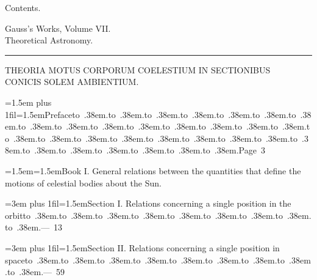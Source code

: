 \clearpage
\begingroup
{}
\renewcommand{\headrulewidth}{0pt}
\begingroup
\newcommand{\ContentsEntry}[4]{\par\begingroup\leftskip=#1\relax\rightskip=0pt plus 1fil\parfillskip=0pt\hangindent=1.5em\hangafter=1\noindent#2\nobreak\hspace{.4em}\mbox{#4}\nobreak\hspace{.5em}\hfill\mbox{#3}\par\endgroup}
\newcommand{\ContentsPoint}{\hbox to .38em{\hfil.\hfil}}
\newcommand{\ContentsText}[2]{\par\begingroup\leftskip=#1\relax\hangindent=1.5em\hangafter=1\noindent#2\par\endgroup}
\newcommand{\ContentsHeading}[1]{\needspace{4\baselineskip}\begin{center}#1\end{center}}
\newcommand{\ContentsRule}{\begin{center}\rule{.14\linewidth}{.4pt}\end{center}}
\newcommand{\ContentsJupiter}{\text{\mdseries\AstroSymbols ♃}}
\newcommand{\ContentsPallas}{\text{\mdseries\AstroSymbols ⚴}}
\ContentsHeading{{\Large Contents.}}
\ContentsHeading{{\large Gauss's Works, Volume VII.}\\Theoretical Astronomy.}
\ContentsRule
\ContentsHeading{THEORIA MOTUS CORPORUM COELESTIUM IN SECTIONIBUS\\CONICIS SOLEM AMBIENTIUM.}
\ContentsEntry{1.5em}{Preface}{Page 3}{\ContentsPoint\ContentsPoint\ContentsPoint\ContentsPoint\ContentsPoint\ContentsPoint\ContentsPoint\ContentsPoint\ContentsPoint\ContentsPoint\ContentsPoint\ContentsPoint\ContentsPoint\ContentsPoint\ContentsPoint\ContentsPoint\ContentsPoint\ContentsPoint\ContentsPoint\ContentsPoint\ContentsPoint\ContentsPoint\ContentsPoint\ContentsPoint\ContentsPoint\ContentsPoint\ContentsPoint\ContentsPoint\ContentsPoint\ContentsPoint}
\ContentsText{1.5em}{Book I. General relations between the quantities that define the motions of celestial bodies about the Sun.}
\ContentsEntry{3em}{Section I. Relations concerning a single position in the orbit}{--- 13}{\ContentsPoint\ContentsPoint\ContentsPoint\ContentsPoint\ContentsPoint\ContentsPoint\ContentsPoint\ContentsPoint\ContentsPoint}
\ContentsEntry{3em}{Section II. Relations concerning a single position in space}{--- 59}{\ContentsPoint\ContentsPoint\ContentsPoint\ContentsPoint\ContentsPoint\ContentsPoint\ContentsPoint\ContentsPoint\ContentsPoint}
